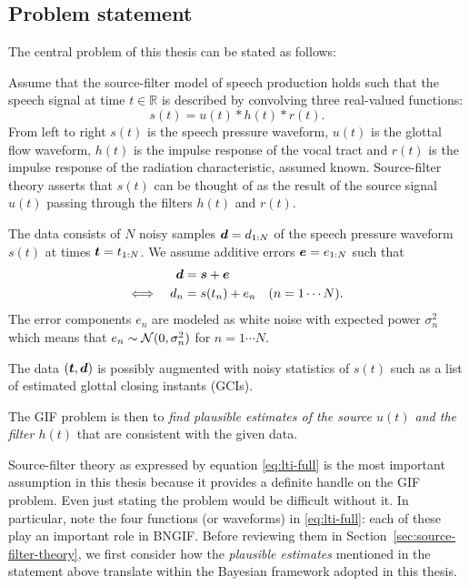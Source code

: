 \begin{chaptersections}
\section{Problem statement\label{sec:problem-statement}}

The central problem of this thesis can be stated as follows:

\begin{mdframed}[frametitle={Glottal inverse filtering (GIF)}]
Assume that the source-filter model of speech production \citep{Fant1960} holds such that the speech signal at time $t \in \mathbb{R}$ is described by convolving three real-valued functions: 
\begin{equation}
    s(t) = u(t) * h(t) * r(t). \label{eq:lti-full}
\end{equation}
From left to right $s(t)$ is the speech pressure waveform, $u(t)$ is the glottal flow waveform, $h(t)$ is the impulse response of the vocal tract and $r(t)$ is the impulse response of the radiation characteristic, assumed known.
Source-filter theory asserts that $s(t)$ can be thought of as the result of the source signal $u(t)$ passing through the filters $h(t)$ and $r(t)$.

The data consists of $N$ noisy samples ${\bm d} = d_{1:N}$ of the speech pressure waveform $s(t)$ at times ${\bm t} = t_{1:N}$.
We assume additive errors ${\bm e} = e_{1:N}$ such that
\begin{align} 
{\bm d} &= {\bm s} + {\bm e} \\
\Longleftrightarrow \quad d_n &= s(t_n) + e_n \quad (n = 1 \cdots N).
\end{align}
The error components $e_n$ are modeled as white noise with expected power $\sigma_n^2$ which means that $e_n  \sim \operatorname{\mathcal{N}}(0, \sigma_n^2)$ for $n = 1 \cdots N$.

The data $({\bm t},{\bm d})$ is possibly augmented with noisy statistics of $s(t)$ such as a list of estimated glottal closing instants (GCIs).

The GIF problem is then to \emph{find plausible estimates of the source $u(t)$ and the filter $h(t)$} that are consistent with the given data.
\end{mdframed}

Source-filter theory as expressed by equation \eqref{eq:lti-full} is the most important assumption in this thesis because it provides a definite handle on the GIF problem.
Even just stating the problem would be difficult without it.
In particular, note the four functions (or waveforms) in \eqref{eq:lti-full}:
each of these play an important role in BNGIF.
Before reviewing them in Section~\ref{sec:source-filter-theory}, we first consider how the \emph{plausible estimates} mentioned in the statement above translate within the Bayesian framework adopted in this thesis.


\end{chaptersections}
